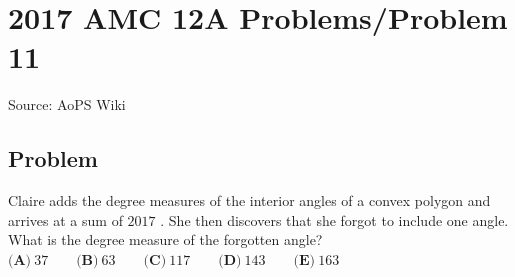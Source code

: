 \documentclass[12pt]{article}
\begin{document}
\section*{{2017 AMC 12A Problems/Problem 11}}
Source: AoPS Wiki

\subsection*{Problem}
Claire adds the degree measures of the interior angles of a convex polygon and arrives at a sum of $2017$ . She then discovers that she forgot to include one angle. What is the degree measure of the forgotten angle? $\textbf{(A)}\ 37\qquad\textbf{(B)}\ 63\qquad\textbf{(C)}\ 117\qquad\textbf{(D)}\ 143\qquad\textbf{(E)}\ 163$
\end{document}
